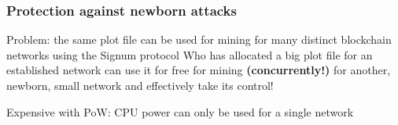\documentclass[11pt]{beamer}  %
\begin{document}
\begin{frame}\frametitle{Protection against newborn attacks}

  \begin{redbox}{Problem: the same plot file can be used for mining for many distinct blockchain
      networks using the Signum protocol}
    Who has allocated a big plot file for an established network can use it for free
    for mining \textbf{(concurrently!)} for another, newborn, small network and effectively take its control!
  \end{redbox}

  \medskip

  \begin{center}
    Expensive with PoW: CPU power can only be used for a single network
  \end{center}

  \bigskip


\end{frame}
\end{document}
